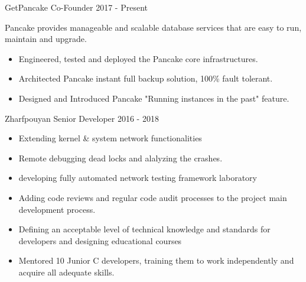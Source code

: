 \documentclass[12pt]{developercv}
\begin{document}
\begin{entrylist}
{		%
		\begin{itemize}
		\end{itemize}
		}
	\entry
		{GetPancake}
		{Co-Founder}
		{2017 - Present}
		{
			Pancake provides manageable and scalable database services that
			are easy to run, maintain and upgrade.\\

			\begin{itemize}
				\itemsep0em
				\item Engineered, tested and deployed the Pancake core infrastructures.\\
				\item Architected Pancake instant full backup solution, 100\% fault tolerant.\\
				\item Designed and Introduced Pancake "Running instances in the past" feature.\\
			\end{itemize}
		}
	\entry
		{Zharfpouyan}
		{Senior Developer}
		{2016 - 2018}
		{
		\begin{itemize}
			\itemsep0em
			\item Extending kernel \& system network functionalities
			\item Remote debugging dead locks and alalyzing the crashes.
			\item developing fully automated network testing framework laboratory
			\item Adding code reviews and regular code audit processes to the project
			      main development process.
			\item Defining an acceptable level of technical knowledge and standards for
			      developers and designing educational courses
			\item Mentored 10 Junior C developers, training them to work independently and
			      acquire all adequate skills.
		\end{itemize}
}
\end{entrylist}
\end{document}
